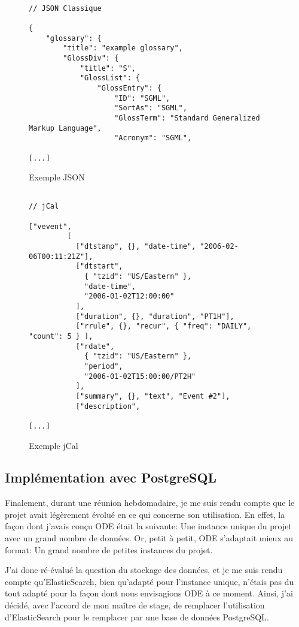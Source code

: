 \begin{figure}[H]
\begin{lstlisting}[frame=single]

// JSON Classique

{
    "glossary": {
        "title": "example glossary",
        "GlossDiv": {
            "title": "S",
            "GlossList": {
                "GlossEntry": {
                    "ID": "SGML",
                    "SortAs": "SGML",
                    "GlossTerm": "Standard Generalized Markup Language",
                    "Acronym": "SGML",

[...]

\end{lstlisting}
\caption{Exemple JSON}
\end{figure}
\begin{figure}[H]
\begin{lstlisting}[frame=single]

// jCal

["vevent",
         [
           ["dtstamp", {}, "date-time", "2006-02-06T00:11:21Z"],
           ["dtstart",
             { "tzid": "US/Eastern" },
             "date-time",
             "2006-01-02T12:00:00"
           ],
           ["duration", {}, "duration", "PT1H"],
           ["rrule", {}, "recur", { "freq": "DAILY", "count": 5 } ],
           ["rdate",
             { "tzid": "US/Eastern" },
             "period",
             "2006-01-02T15:00:00/PT2H"
           ],
           ["summary", {}, "text", "Event #2"],
           ["description",

[...]

\end{lstlisting}
\caption{Exemple jCal}
\end{figure}

\newpage

\subsection{Implémentation avec PostgreSQL}

Finalement, durant une réunion hebdomadaire, je me suis rendu compte que le projet avait légèrement évolué en ce qui concerne son utilisation. En effet, la façon dont j'avais conçu ODE était la suivante: Une instance unique du projet avec un grand nombre de données. Or, petit à petit, ODE s'adaptait mieux au format: Un grand nombre de petites instances du projet.

J'ai donc ré-évalué la question du stockage des données, et je me suis rendu compte qu'ElasticSearch, bien qu'adapté pour l'instance unique, n'étais pas du tout adapté pour la façon dont nous envisagions ODE à ce moment. Ainsi, j'ai décidé, avec l'accord de mon maître de stage, de remplacer l'utilisation d'ElasticSearch pour le remplacer par une base de données PostgreSQL.

